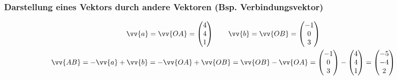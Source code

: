 \subsubsection{Darstellung eines Vektors durch andere Vektoren (Bsp. Verbindungsvektor)}
\begin{gather*}
  \vv{a} = \vv{OA} = \begin{pmatrix}4 \\ 4 \\ 1\end{pmatrix} \qquad \vv{b} = \vv{OB} = \begin{pmatrix}-1 \\ 0 \\ 3\end{pmatrix} \\
  \vv{AB} = -\vv{a} + \vv{b} = -\vv{OA} + \vv{OB} = \vv{OB} - \vv{OA} = \begin{pmatrix}-1 \\ 0 \\ 3\end{pmatrix} - \begin{pmatrix}4 \\ 4 \\ 1\end{pmatrix} = \begin{pmatrix}-5 \\ -4 \\ 2\end{pmatrix}
\end{gather*}

